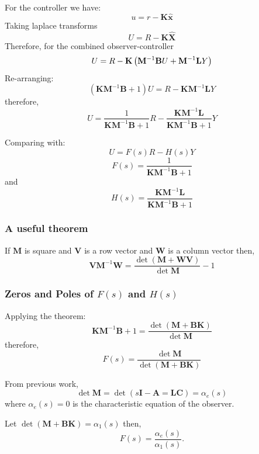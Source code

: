 For the controller we have:
\[
u = r - \mathbf{K}\hat{\mathbf{x}}
\]
Taking laplace transforms
\[
U = R - \mathbf{K}\hat{\mathbf{X}}
\]
Therefore, for the combined observer-controller
\[
U=R-\mathbf{K}\left(\mathbf{M}^{-1}\mathbf{B}U + \mathbf{M}^{-1}{\bf{L}}Y\right)
\]
Re-arranging:
\[
\left(\mathbf{KM}^{-1}\mathbf{B}+1\right)U=R-\mathbf{KM}^{-1}\mathbf{L}Y
\]
therefore,
\[
U=\frac{1}{\mathbf{KM}^{-1}\mathbf{B}+1}R-\frac{\mathbf{KM}^{-1}\mathbf{L}}{\mathbf{KM}^{-1}\mathbf{B}+1}Y
\]

Comparing with: $$U=F(s)R-H(s)Y$$
\[
F(s) = \frac{1}{\mathbf{KM}^{-1}\mathbf{B}+1}
\]
and
\[
H(s) = \frac{\mathbf{KM}^{-1}\mathbf{L}}{\mathbf{KM}^{-1}\mathbf{B}+1}
\]


 

\subsubsection*{A useful theorem} %
\label{ssub:a_useful_theorem}

If $\mathbf{M}$ is square and $\mathbf{V}$ is a row vector and $\mathbf{W}$ is a column vector then,
\[
\mathbf{VM}^{-1}\mathbf{W}=\frac{\det\left(\mathbf{M}+\mathbf{WV}\right)}{\det{\mathbf{M}}}-1
\]
 

 
\subsubsection*{Zeros and Poles of $F(s)$ and $H(s)$} %
\label{ssub:zeros_and_poles_of_f_s_and_h_s_}

Applying the theorem:
\[
\mathbf{KM}^{-1}\mathbf{B}+1=\frac{\det\left(\mathbf{M}+\mathbf{BK}\right)}{\det{\mathbf{M}}}
\]
therefore,
\[
F(s) = \frac{\det\mathbf{M}}{\det\left(\mathbf{M}+\mathbf{BK}\right)}
\]

From previous work,
\[
\det\mathbf{M}=\det\left(s\mathbf{I}-\mathbf{A}=\mathbf{LC}\right)=\alpha_e(s)
\]
where $\alpha_e(s)=0$ is the characteristic equation of the observer.

Let $\det\left(\mathbf{M}+\mathbf{BK}\right)=\alpha_1(s)$ then,
\[
F(s)=\frac{\alpha_e(s)}{\alpha_1(s)}.
\]

